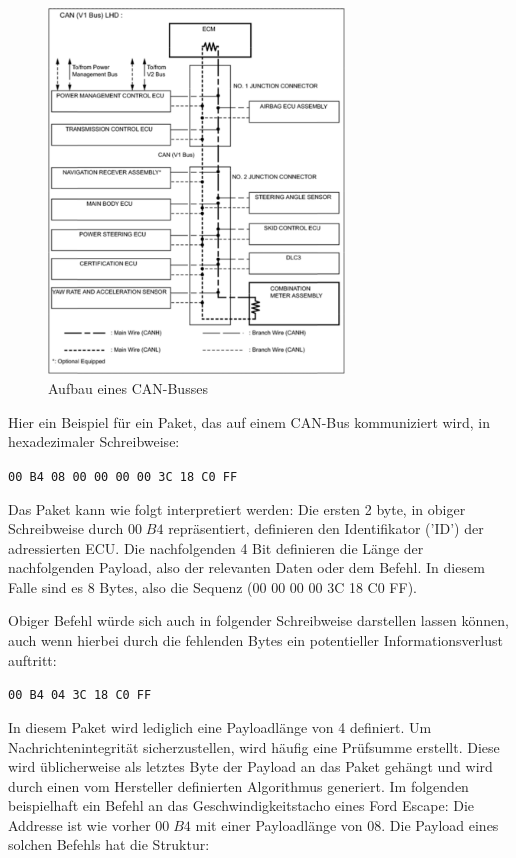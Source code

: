 \documentclass[
    fontsize=12pt,
    headings=small,
    parskip=half,           %
    bibliography=totoc,9
    numbers=noenddot,       %
    open=any,               %
    ]{scrreprt}
\begin{document}
\FloatBarrier
\begin{figure}[h!]
	\centering
  \includegraphics[width=0.7\textwidth,keepaspectratio]{pic/can-bus.png}
	\caption{Aufbau eines CAN-Busses}
\end{figure}
\FloatBarrier
\newpage


Hier ein Beispiel für ein Paket, das auf einem CAN-Bus kommuniziert wird, in hexadezimaler Schreibweise:

\centerline{\texttt{00 B4 08 00 00 00 00 3C 18 C0 FF}}

Das Paket kann wie folgt interpretiert werden:
Die ersten 2 byte, in obiger Schreibweise durch $00\;B4$ repräsentiert, definieren den Identifikator ('ID') der adressierten ECU. Die nachfolgenden 4 Bit definieren die Länge der nachfolgenden Payload, also der relevanten Daten oder dem Befehl. In diesem Falle sind es 8 Bytes, also die Sequenz (00 00 00 00 3C 18 C0 FF).

Obiger Befehl würde sich auch in folgender Schreibweise darstellen lassen können, auch wenn hierbei durch die fehlenden Bytes ein potentieller Informationsverlust auftritt:

\centerline{\texttt{00 B4 04 3C 18 C0 FF}}

In diesem Paket wird lediglich eine Payloadlänge von 4 definiert. Um Nachrichtenintegrität sicherzustellen, wird häufig eine Prüfsumme erstellt. Diese wird üblicherweise als letztes Byte der Payload an das Paket gehängt und wird durch einen vom Hersteller definierten Algorithmus generiert.
Im folgenden beispielhaft ein Befehl an das Geschwindigkeitstacho eines Ford Escape:
Die Addresse ist wie vorher $00\;B4$ mit einer Payloadlänge von $08$. Die Payload eines solchen Befehls hat die Struktur:
\end{document}
